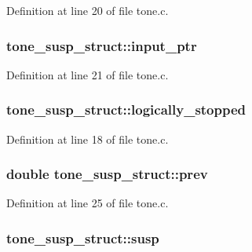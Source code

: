 Definition at line 20 of file tone.\+c.

\subsubsection[{\texorpdfstring{input\+\_\+ptr}{input_ptr}}]{ tone\+\_\+susp\+\_\+struct\+::input\+\_\+ptr}\hypertarget{structtone__susp__struct_a40a79c1ab23136bc0dfec291dde905da}{}\label{structtone__susp__struct_a40a79c1ab23136bc0dfec291dde905da}


Definition at line 21 of file tone.\+c.

\subsubsection[{\texorpdfstring{logically\+\_\+stopped}{logically_stopped}}]{ tone\+\_\+susp\+\_\+struct\+::logically\+\_\+stopped}\hypertarget{structtone__susp__struct_a91fe73754ae328c00cb40a9e335bb187}{}\label{structtone__susp__struct_a91fe73754ae328c00cb40a9e335bb187}


Definition at line 18 of file tone.\+c.

\subsubsection[{\texorpdfstring{prev}{prev}}]{\setlength{\rightskip}{0pt plus 5cm}double tone\+\_\+susp\+\_\+struct\+::prev}\hypertarget{structtone__susp__struct_a9e6938eb08597f722e2571ae223ae636}{}\label{structtone__susp__struct_a9e6938eb08597f722e2571ae223ae636}


Definition at line 25 of file tone.\+c.

\subsubsection[{\texorpdfstring{susp}{susp}}]{ tone\+\_\+susp\+\_\+struct\+::susp}\hypertarget{structtone__susp__struct_ad2cdf231f57ce21c2645cbc153de0921}{}\label{structtone__susp__struct_ad2cdf231f57ce21c2645cbc153de0921}


